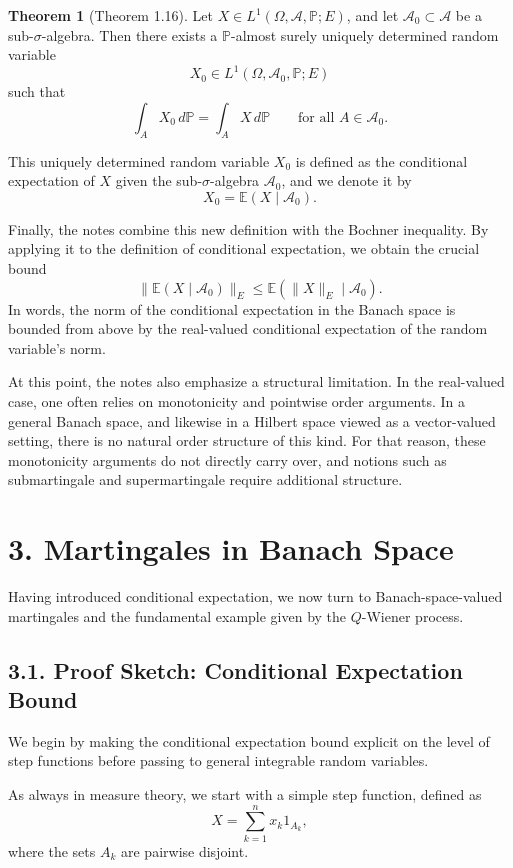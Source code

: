 \documentclass[11pt]{article}
\theoremstyle{definition}
\newtheorem{theorem}{Theorem}
\theoremstyle{remark}
\begin{document}
\begin{theorem}[Theorem 1.16]
Let \(X\in L^1(\Omega,\mathcal A,\mathbb P;E)\), and let \(\mathcal A_0\subset \mathcal A\) be a sub-\(\sigma\)-algebra. Then there exists a \(\mathbb P\)-almost surely uniquely determined random variable
\[
X_0\in L^1(\Omega,\mathcal A_0,\mathbb P;E)
\]
such that
\[
\int_A X_0\,d\mathbb P=\int_A X\,d\mathbb P
\qquad \text{for all } A\in \mathcal A_0.
\]
\end{theorem}

This uniquely determined random variable \(X_0\) is defined as the conditional expectation of \(X\) given the sub-\(\sigma\)-algebra \(\mathcal A_0\), and we denote it by
\[
X_0=\mathbb E(X\mid \mathcal A_0).
\]

Finally, the notes combine this new definition with the Bochner inequality. By applying it to the definition of conditional expectation, we obtain the crucial bound
\[
\|\mathbb E(X\mid \mathcal A_0)\|_E\le \mathbb E(\|X\|_E\mid \mathcal A_0).
\]
In words, the norm of the conditional expectation in the Banach space is bounded from above by the real-valued conditional expectation of the random variable's norm.

At this point, the notes also emphasize a structural limitation. In the real-valued case, one often relies on monotonicity and pointwise order arguments. In a general Banach space, and likewise in a Hilbert space viewed as a vector-valued setting, there is no natural order structure of this kind. For that reason, these monotonicity arguments do not directly carry over, and notions such as submartingale and supermartingale require additional structure.

\section*{3. Martingales in Banach Space}
Having introduced conditional expectation, we now turn to Banach-space-valued martingales and the fundamental example given by the \(Q\)-Wiener process.

\subsection*{3.1. Proof Sketch: Conditional Expectation Bound}
We begin by making the conditional expectation bound explicit on the level of step functions before passing to general integrable random variables.

As always in measure theory, we start with a simple step function, defined as
\[
X=\sum_{k=1}^{n} x_k 1_{A_k},
\]
where the sets \(A_k\) are pairwise disjoint.
\end{document}
